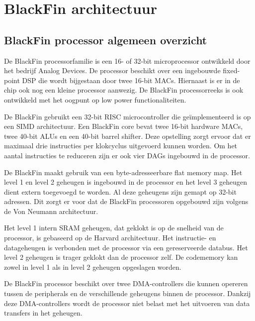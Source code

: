 \chapter{BlackFin architectuur}
	
	\section{BlackFin processor algemeen overzicht}

		\par De BlackFin processorfamilie is een 16- of 32-bit microprocessor ontwikkeld door het bedrijf Analog Devices. De processor beschikt over een ingebouwde fixed-point DSP die wordt bijgestaan door twee 16-bit MACs. Hiernaast is er in de chip ook nog een kleine processor aanwezig. De BlackFin processorreeks is ook ontwikkeld met het oogpunt op low power functionaliteiten.

		\par De BlackFin gebruikt een 32-bit RISC microcontroller die ge\"implementeerd is op een SIMD architectuur. Een BlackFin core bevat twee 16-bit hardware MACs, twee 40-bit ALUs en een 40-bit barrel shifter. Deze opstelling zorgt ervoor dat er maximaal drie instructies per klokcyclus uitgevoerd kunnen worden. Om het aantal instructies te reduceren zijn er ook vier DAGs ingebouwd in de processor.

		\par De BlackFin maakt gebruik van een byte-adresseerbare flat memory map. Het level 1 en level 2 geheugen is ingebouwd in de processor en het level 3 geheugen dient extern toegevoegd te worden. Al deze geheugens zijn gemapt op 32-bit adressen. Dit zorgt er voor dat de BlackFin processoren opgebouwd zijn volgens de Von Neumann architectuur.

		\par Het level 1 intern SRAM geheugen, dat geklokt is op de snelheid van de processor, is gebaseerd op de Harvard architectuur. Het instructie- en datageheugen is verbonden met de processor via een gereserveerde databus. Het level 2 geheugen is trager geklokt dan de processor zelf. De codememory kan zowel in level 1 als in level 2 geheugen opgeslagen worden.

		\par De BlackFin processor beschikt over twee DMA-controllers die kunnen opereren tussen de peripherals en de verschillende geheugens binnen de processor. Dankzij deze DMA-controllers wordt de processor niet belast met het uitvoeren van data transfers in het geheugen.

